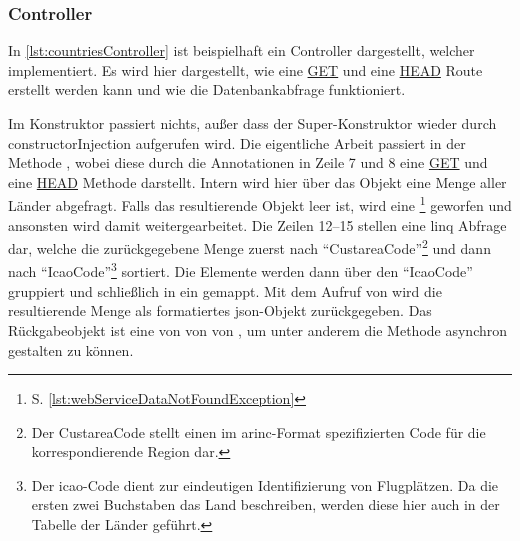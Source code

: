 	\subsubsection{Controller}\label{subsubsec:controller}
		In \vref{lst:countriesController} ist beispielhaft ein Controller dargestellt,
		welcher  implementiert.
		Es wird hier dargestellt,
		wie eine \hyperref[itm:httpget]{GET}
		und eine \hyperref[itm:httphead]{HEAD} Route
		erstellt werden kann und wie die Datenbankabfrage funktioniert.

		Im Konstruktor passiert nichts,
		außer dass der Super-Konstruktor wieder durch \gls{constructorInjection} aufgerufen wird.
		Die eigentliche Arbeit passiert in der Methode ,
		wobei diese durch die Annotationen in Zeile 7 und 8 eine \hyperref[itm:httpget]{GET}
		und eine \hyperref[itm:httphead]{HEAD} Methode darstellt.
		Intern wird hier über das  Objekt eine Menge aller Länder abgefragt.
		Falls das resultierende Objekt leer ist,
		wird eine \footnote{S. \vref{lst:webServiceDataNotFoundException}} geworfen
		und ansonsten wird damit weitergearbeitet.
		Die Zeilen 12--15 stellen eine \gls{linq} Abfrage dar,
		welche die zurückgegebene Menge zuerst nach
		\enquote{CustareaCode}\footnote{Der CustareaCode stellt einen im \gls{arinc}-Format spezifizierten Code für die korrespondierende Region dar.}
		und dann nach
		\enquote{IcaoCode}\footnote{Der \gls{icao}-Code dient zur eindeutigen Identifizierung von Flugplätzen. Da die ersten zwei Buchstaben das Land beschreiben, werden diese hier auch in der Tabelle der Länder geführt.}
		sortiert.
		Die Elemente werden dann über den \enquote{IcaoCode} gruppiert
		und schließlich in ein  gemappt.
		Mit dem Aufruf von  wird die resultierende Menge
		als formatiertes \gls{json}-Objekt zurückgegeben.
		Das Rückgabeobjekt ist eine  von  von 
		von ,
		um unter anderem die Methode asynchron gestalten zu können.
